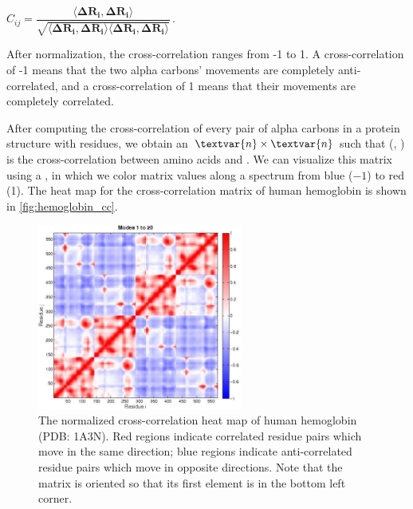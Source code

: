 \begin{center}
$ C_{ij} = \dfrac{\langle \mathbf{\Delta R_i}, \mathbf{\Delta R_i} \rangle}{\sqrt{\langle \mathbf{\Delta R_i}, \mathbf{\Delta R_i} \rangle \langle \mathbf{\Delta R_i}, \mathbf{\Delta R_i} \rangle}}$\,.
\end{center}

After normalization, the cross-correlation ranges from -1 to 1. A cross-correlation of -1 means that the two alpha carbons' movements are completely anti-correlated, and a cross-correlation of 1 means that their movements are completely correlated.

After computing the cross-correlation of every pair of alpha carbons in a protein structure with  residues, we obtain an $\textvar{n} \times \textvar{n}$   such that (, ) is the cross-correlation between amino acids  and . We can visualize this matrix using a , in which we color matrix values along a spectrum from blue ($-1$) to red (1). The heat map for the cross-correlation matrix of human hemoglobin is shown in \autoref{fig:hemoglobin_cc}.\\

\begin{figure}[h]
	\centering
	\mySfFamily
	\includegraphics[width = 0.6\textwidth]{../images/hemoglobin_cc.png}
	\caption{The normalized cross-correlation heat map of human hemoglobin (PDB: 1A3N). Red regions indicate correlated residue pairs which move in the same direction; blue regions indicate anti-correlated residue pairs which move in opposite directions. Note that the matrix is oriented so that its first element is in the bottom left corner.}
	\label{fig:hemoglobin_cc}
\end{figure}

